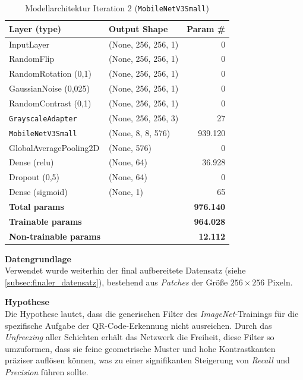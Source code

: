 \documentclass[
    a4paper,        %
    11pt,           %
    ngerman,        %
    parskip=half,   %
    listof=totoc,   %
    bibliography=totoc %
]{scrartcl}
\begin{document}
\begin{table}[H]
    \centering
    \caption{Modellarchitektur Iteration 2 (\texttt{MobileNetV3Small})}
    \label{tab:mnetv3s_model_summary_iter2}
    \begin{tabular}{llr}
        \toprule
        \textbf{Layer (type)} & \textbf{Output Shape} & \textbf{Param \#} \\
        \midrule
        InputLayer & (None, 256, 256, 1) & 0 \\
        RandomFlip & (None, 256, 256, 1) & 0 \\
        RandomRotation (0,1) & (None, 256, 256, 1) & 0 \\
        GaussianNoise (0,025) & (None, 256, 256, 1) & 0 \\
        RandomContrast (0,1) & (None, 256, 256, 1) & 0 \\
        \texttt{GrayscaleAdapter} & (None, 256, 256, 3) & 27 \\
        \texttt{MobileNetV3Small} & (None, 8, 8, 576) & 939.120 \\
        GlobalAveragePooling2D & (None, 576) & 0 \\
        Dense (relu) & (None, 64) & 36.928 \\
        Dropout (0,5) & (None, 64) & 0 \\
        Dense (sigmoid) & (None, 1) & 65 \\
        \midrule
        \textbf{Total params} & & \textbf{976.140} \\
        \textbf{Trainable params} & & \textbf{964.028} \\
        \textbf{Non-trainable params} & & \textbf{12.112} \\
        \bottomrule
    \end{tabular}
\end{table}

\textbf{Datengrundlage} \\
Verwendet wurde weiterhin der final aufbereitete Datensatz (siehe \autoref{subsec:finaler_datensatz}), bestehend aus \textit{Patches} der Größe $256 \times 256$ Pixeln.

\textbf{Hypothese} \\
Die Hypothese lautet, dass die generischen Filter des \textit{ImageNet}-Trainings für die spezifische Aufgabe der QR-Code-Erkennung nicht ausreichen. Durch das \textit{Unfreezing} aller Schichten erhält das Netzwerk die Freiheit, diese Filter so umzuformen, dass sie feine geometrische Muster und hohe Kontrastkanten präziser auflösen können, was zu einer signifikanten Steigerung von \textit{Recall} und \textit{Precision} führen sollte.
\end{document}
